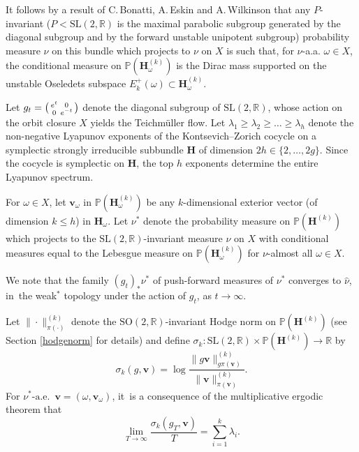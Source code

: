 \documentclass[10pt]{amsart}
\newenvironment{smallpmatrix}{\big(\begin{smallmatrix}}{\end{smallmatrix}\big)}
\theoremstyle{plain}
\theoremstyle{definition}
\numberwithin{equation}{subsection}
\newcommand\bP{\mathbb{P}}
\newcommand\bR{\mathbb{R}}\let\R\bR
\newcommand{\SL}{\mathrm{SL}}
\newcommand{\SO}{\mathrm{SO}}
\newcommand{\bfH}{\boldsymbol{H}}
\newcommand{\bfv}{\boldsymbol{v}}
\begin{document}
It follows by a result of C.\,Bonatti, A.\,Eskin and A.\,Wilkinson \cite{BEW20} that any $P$\nobreakdash-invariant ($P<\SL(2,\R)$ is the maximal parabolic subgroup generated by the diagonal subgroup and by the forward unstable unipotent subgroup) probability measure $\hat{\nu}$ on this bundle which projects to $\nu$ on $X$ is such that, for $\nu$-a.a. $\omega\in X$, the conditional measure on $\bP (\bfH^{(k)}_\omega)$ is the Dirac mass supported on the unstable Oseledets subspace \hbox{$E^+_k(\omega)\subset \bfH^{(k)}_\omega$}.

Let $g_t=\begin{smallpmatrix}e^{t}&0\\0&e^{-t}\end{smallpmatrix}$ denote the diagonal subgroup of $\SL(2,\bR)$, whose action on the orbit closure $X$ yields the Teichmüller flow.
Let $\lambda_1\geq \lambda_2 \geq \dots \geq \lambda_h$ denote the non-negative Lyapunov exponents of the Kontsevich--Zorich cocycle on a symplectic strongly irreducible subbundle
$\bfH$ of dimension $2h\in \{2,\dots, 2g\}$. Since the cocycle is symplectic on $\bfH$, the top $h$ exponents determine the entire Lyapunov spectrum.

For $\omega\in X$, let $\bfv_\omega$ in $\bP (\bfH^{(k)}_\omega)$ be any $k$-dimensional exterior vector (of dimension $k\leq h$) in $\bfH_\omega$. Let $\nu^*$ denote the probability measure on $\bP (\bfH^{(k)})$ which projects to the $\SL(2,\R)$-invariant
measure $\nu$ on $X$ with conditional measures equal to the
Lebesgue measure on $\bP (\bfH^{(k)}_\omega)$ for $\nu$-almost all $\omega \in X$.

We note that the family \((g_t)_{\ast}\nu^{\ast}\) of push-forward measures of \(\nu^{\ast}\) converges to $\hat \nu$, in~the weak\(^\ast\) topology under the action of \(g_t\), as $t\to\infty$.

Let $\|\cdot\|^{(k)}_{\pi(\cdot)}$ denote the $\SO(2,\bR)$-invariant Hodge norm on $\bP (\bfH^{(k)})$ (see Section \ref{hodgenorm} for details) and define\vspace*{-3pt}
$\sigma_k : \SL(2,\bR) \times \bP (\bfH^{(k)}) \to \bR$ by
\[
\sigma_k(g,\bfv) = \log \frac{\|g \bfv\|^{(k)}_{g\pi(\bfv)}}{\|\bfv\|^{(k)}_{\pi(\bfv)}}.
\]
For $\nu^*\text{-a.e.}$~$\bfv = (\omega,\bfv_\omega)$, it~is a consequence of the multiplicative ergodic theorem that\vspace*{-3pt}
\[
\lim_{T\to\infty} \frac{\sigma_k(g_T, \bfv)}{T} = \sum_{i=1}^k \lambda_i.
\]
\end{document}
